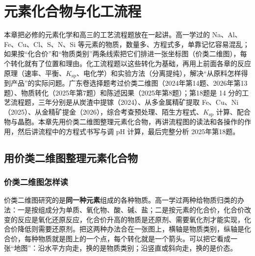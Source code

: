 
\chapter{元素化合物与化工流程}

本章把必修的元素化学和高三的工艺流程题放在一起讲。高一学过的 Na、Al、Fe、Cu、Cl、S、N、Si 等元素的物质，数量多、方程式多，单靠记忆容易混乱；如果按“化合价”和“物质类别”两条线索把它们排进一张坐标图（价类二维图），每个转化就有了位置和理由。化工流程题以这些转化为基础，再用上前面各章的反应原理（速率、平衡、$K_\text{sp}$、电化学）和实验方法（分离提纯），解决“从原料怎样得到产品”的实际问题。广东卷选择题考过价类二维图（2024年第14题、2026年第13题）、物质转化（2025年第7题）和陈述因果（2025年第8题）；第18题是 14 分的工艺流程题，三年分别是从炭渣中提镓（2024）、从多金属精矿提取 Fe、Cu、Ni（2025）、从金精矿提金（2026），综合考查预处理、陌生方程式、$K_\text{sp}$ 计算、配合物与晶胞。本章先用价类二维图整理元素化合物，再讲流程图的读法和各操作的作用，然后讲流程中的方程式书写与调 pH 计算，最后完整分析 2025年第18题。

\section{用价类二维图整理元素化合物}

\subsection{价类二维图怎样读}
价类二维图研究的是\textbf{同一种元素}组成的各种物质。高一学过两种给物质归类的办法：一是按组成分为单质、氧化物、酸、碱、盐；二是按元素的化合价，化合价改变的反应是氧化还原反应，化合价升高的物质是还原剂、需要氧化剂才能实现，化合价降低则需要还原剂。把这两种办法合在一张图上，横轴是物质类别，纵轴是化合价，每种物质就是图上的一个点，每个转化就是一个箭头。可以把它看成一张“地图”：沿水平方向走，换的是物质类别；沿竖直或斜向走，换的是价态。

